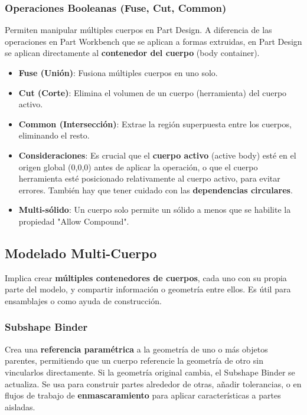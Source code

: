 \documentclass{article}
\begin{document}
\subsubsection*{Operaciones Booleanas (Fuse, Cut, Common)}
Permiten manipular múltiples cuerpos en Part Design. A diferencia de las operaciones en Part Workbench que se aplican a formas extruidas, en Part Design se aplican directamente al \textbf{contenedor del cuerpo} (body container).
\begin{itemize}[noitemsep,topsep=0pt]
    \item \textbf{Fuse (Unión)}: Fusiona múltiples cuerpos en uno solo.
    \item \textbf{Cut (Corte)}: Elimina el volumen de un cuerpo (herramienta) del cuerpo activo.
    \item \textbf{Common (Intersección)}: Extrae la región superpuesta entre los cuerpos, eliminando el resto.
    \item \textbf{Consideraciones}: Es crucial que el \textbf{cuerpo activo} (active body) esté en el origen global (0,0,0) antes de aplicar la operación, o que el cuerpo herramienta esté posicionado relativamente al cuerpo activo, para evitar errores. También hay que tener cuidado con las \textbf{dependencias circulares}.
    \item \textbf{Multi-sólido}: Un cuerpo solo permite un sólido a menos que se habilite la propiedad "Allow Compound".
\end{itemize}

\subsection*{Modelado Multi-Cuerpo}
Implica crear \textbf{múltiples contenedores de cuerpos}, cada uno con su propia parte del modelo, y compartir información o geometría entre ellos. Es útil para ensamblajes o como ayuda de construcción.

\subsubsection*{Subshape Binder}
Crea una \textbf{referencia paramétrica} a la geometría de uno o más objetos parentes, permitiendo que un cuerpo referencie la geometría de otro sin vincularlos directamente. Si la geometría original cambia, el Subshape Binder se actualiza. Se usa para construir partes alrededor de otras, añadir tolerancias, o en flujos de trabajo de \textbf{enmascaramiento} para aplicar características a partes aisladas.
\end{document}
